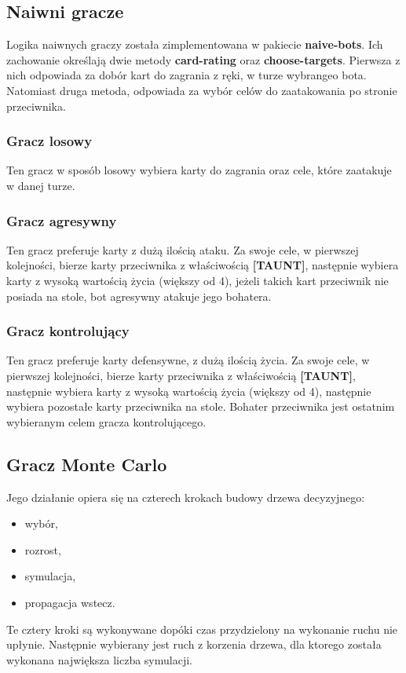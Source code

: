 \documentclass[a4paper, 12pt]{article}
\begin{document}
\subsection{Naiwni gracze}
Logika naiwnych graczy została zimplementowana w pakiecie \textbf{naive-bots}. Ich zachowanie określają dwie metody \textbf{card-rating} oraz \textbf{choose-targets}. Pierwsza z nich odpowiada za dobór kart do zagrania z ręki, w turze wybrangeo bota. Natomiast druga metoda, odpowiada za wybór celów do zaatakowania po stronie przeciwnika.

\subsubsection{Gracz losowy}
Ten gracz w sposób losowy wybiera karty do zagrania oraz cele, które zaatakuje w danej turze.

\subsubsection{Gracz agresywny}
Ten gracz preferuje karty z dużą ilością ataku. Za swoje cele, w pierwszej kolejności, bierze karty przeciwnika z właściwością \textbf{[TAUNT]}, następnie wybiera karty z wysoką wartością życia (większy od 4), jeżeli takich kart przeciwnik nie posiada na stole, bot agresywny atakuje jego bohatera.

\subsubsection{Gracz kontrolujący}
Ten gracz preferuje karty defensywne, z dużą ilością życia. Za swoje cele, w pierwszej kolejności, bierze karty przeciwnika z właściwością \textbf{[TAUNT]}, następnie wybiera karty z wysoką wartością życia (większy od 4), następnie wybiera pozostałe karty przeciwnika na stole. Bohater przeciwnika jest ostatnim wybieranym celem gracza kontrolującego.

\subsection{Gracz Monte Carlo}
Jego działanie opiera się na czterech krokach budowy drzewa decyzyjnego:
\begin{itemize}
\item wybór,
\item rozrost,
\item symulacja,
\item propagacja wstecz.
\end{itemize}
Te cztery kroki są wykonywane dopóki czas przydzielony na wykonanie ruchu nie upłynie. Następnie wybierany jest ruch z korzenia drzewa, dla ktorego została wykonana największa liczba symulacji.
\end{document}
